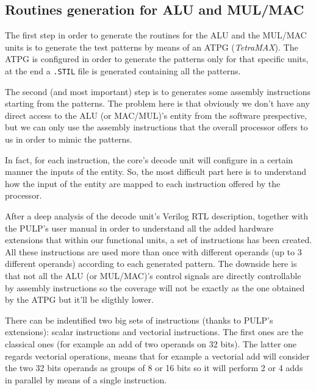 \documentclass[paper=a4, fontsize=10pt]{scrartcl}	%
\begin{document}
	\subsection{Routines generation for ALU and MUL/MAC}
	The first step in order to generate the routines for the ALU and the MUL/MAC units is to generate the test patterns by means of an ATPG (\textit{TetraMAX}). The ATPG is configured in order to generate the patterns only for that specific units, at the end a \texttt{.STIL} file is generated containing all the patterns. \newline

	The second (and most important) step is to generates some assembly instructions starting from the patterns. The problem here is that obviously we don't have any direct access to the ALU (or MAC/MUL)'s entity from the software prespective, but we can only use the assembly instructions that the overall processor offers to us in order to mimic the patterns. \newline
	
	In fact, for each instruction, the core's decode unit will configure in a certain manner the inputs of the entity. So, the most difficult part here is to understand how the input of the entity are mapped to each instruction offered by the processor. \newline

	After a deep analysis of the decode unit's Verilog RTL description, together with the PULP's user manual in order to understand all the added hardware extensions that within our functional units, a set of instructions has been created. All these instructions are used more than once with different operands (up to 3 different operands) according to each generated pattern. The downside here is that not all the ALU (or MUL/MAC)'s control signals are directly controllable by assembly instructions so the coverage will not be exactly as the one obtained by the ATPG but it'll be sligthly lower. \newline
	
	There can be indentified two big sets of instructions (thanks to PULP's extensions): scalar instructions and vectorial instructions. The first ones are the classical ones (for example an add of two operands on 32 bits). The latter one regards vectorial operations, means that for example a vectorial add will consider the two 32 bits operands as groups of 8 or 16 bits so it will perform 2 or 4 adds in parallel by means of a single instruction. \newline
\end{document}
